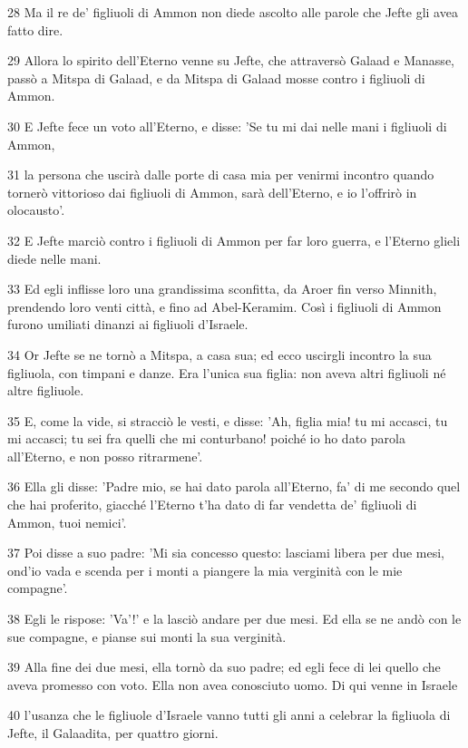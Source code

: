 \par 28 Ma il re de' figliuoli di Ammon non diede ascolto alle parole che Jefte gli avea fatto dire.
\par 29 Allora lo spirito dell'Eterno venne su Jefte, che attraversò Galaad e Manasse, passò a Mitspa di Galaad, e da Mitspa di Galaad mosse contro i figliuoli di Ammon.
\par 30 E Jefte fece un voto all'Eterno, e disse: 'Se tu mi dai nelle mani i figliuoli di Ammon,
\par 31 la persona che uscirà dalle porte di casa mia per venirmi incontro quando tornerò vittorioso dai figliuoli di Ammon, sarà dell'Eterno, e io l'offrirò in olocausto'.
\par 32 E Jefte marciò contro i figliuoli di Ammon per far loro guerra, e l'Eterno glieli diede nelle mani.
\par 33 Ed egli inflisse loro una grandissima sconfitta, da Aroer fin verso Minnith, prendendo loro venti città, e fino ad Abel-Keramim. Così i figliuoli di Ammon furono umiliati dinanzi ai figliuoli d'Israele.
\par 34 Or Jefte se ne tornò a Mitspa, a casa sua; ed ecco uscirgli incontro la sua figliuola, con timpani e danze. Era l'unica sua figlia: non aveva altri figliuoli né altre figliuole.
\par 35 E, come la vide, si stracciò le vesti, e disse: 'Ah, figlia mia! tu mi accasci, tu mi accasci; tu sei fra quelli che mi conturbano! poiché io ho dato parola all'Eterno, e non posso ritrarmene'.
\par 36 Ella gli disse: 'Padre mio, se hai dato parola all'Eterno, fa' di me secondo quel che hai proferito, giacché l'Eterno t'ha dato di far vendetta de' figliuoli di Ammon, tuoi nemici'.
\par 37 Poi disse a suo padre: 'Mi sia concesso questo: lasciami libera per due mesi, ond'io vada e scenda per i monti a piangere la mia verginità con le mie compagne'.
\par 38 Egli le rispose: 'Va'!' e la lasciò andare per due mesi. Ed ella se ne andò con le sue compagne, e pianse sui monti la sua verginità.
\par 39 Alla fine dei due mesi, ella tornò da suo padre; ed egli fece di lei quello che aveva promesso con voto. Ella non avea conosciuto uomo. Di qui venne in Israele
\par 40 l'usanza che le figliuole d'Israele vanno tutti gli anni a celebrar la figliuola di Jefte, il Galaadita, per quattro giorni.


